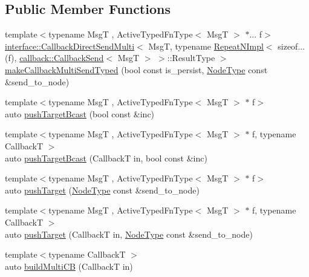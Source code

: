 \subsection*{Public Member Functions}
\begin{DoxyCompactItemize}
\item 
{\footnotesize template$<$typename MsgT , Active\+Typed\+Fn\+Type$<$ Msg\+T $>$ $\ast$... f$>$ }\\\hyperlink{structvt_1_1pipe_1_1interface_1_1_callback_direct_send_multi}{interface\+::\+Callback\+Direct\+Send\+Multi}$<$ MsgT, typename \hyperlink{structvt_1_1pipe_1_1_repeat_n_impl}{Repeat\+N\+Impl}$<$ sizeof...(f), \hyperlink{structvt_1_1pipe_1_1callback_1_1_callback_send}{callback\+::\+Callback\+Send}$<$ MsgT $>$ $>$\+::Result\+Type $>$ \hyperlink{structvt_1_1pipe_1_1_pipe_manager_typed_a1b4f3f5a713ebec4fff1189021ff501b}{make\+Callback\+Multi\+Send\+Typed} (bool const is\+\_\+persist, \hyperlink{namespacevt_a866da9d0efc19c0a1ce79e9e492f47e2}{Node\+Type} const \&send\+\_\+to\+\_\+node)
\item 
{\footnotesize template$<$typename MsgT , Active\+Typed\+Fn\+Type$<$ Msg\+T $>$ $\ast$ f$>$ }\\auto \hyperlink{structvt_1_1pipe_1_1_pipe_manager_typed_ae6dbfc18f6dc280c007d02c25bee38dc}{push\+Target\+Bcast} (bool const \&inc)
\item 
{\footnotesize template$<$typename MsgT , Active\+Typed\+Fn\+Type$<$ Msg\+T $>$ $\ast$ f, typename CallbackT $>$ }\\auto \hyperlink{structvt_1_1pipe_1_1_pipe_manager_typed_a89e6ea6de5c6723b1cef14657ba588ab}{push\+Target\+Bcast} (CallbackT in, bool const \&inc)
\item 
{\footnotesize template$<$typename MsgT , Active\+Typed\+Fn\+Type$<$ Msg\+T $>$ $\ast$ f$>$ }\\auto \hyperlink{structvt_1_1pipe_1_1_pipe_manager_typed_a33bb7d066b2ca629c000d15c05323e4a}{push\+Target} (\hyperlink{namespacevt_a866da9d0efc19c0a1ce79e9e492f47e2}{Node\+Type} const \&send\+\_\+to\+\_\+node)
\item 
{\footnotesize template$<$typename MsgT , Active\+Typed\+Fn\+Type$<$ Msg\+T $>$ $\ast$ f, typename CallbackT $>$ }\\auto \hyperlink{structvt_1_1pipe_1_1_pipe_manager_typed_a2f793d591d216dfa38f8c95cf42e25f1}{push\+Target} (CallbackT in, \hyperlink{namespacevt_a866da9d0efc19c0a1ce79e9e492f47e2}{Node\+Type} const \&send\+\_\+to\+\_\+node)
\item 
{\footnotesize template$<$typename CallbackT $>$ }\\auto \hyperlink{structvt_1_1pipe_1_1_pipe_manager_typed_aace7b9169efa610aa1d006eef4e68510}{build\+Multi\+CB} (CallbackT in)

\end{DoxyCompactItemize}
